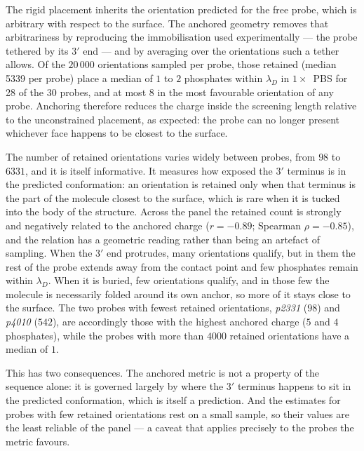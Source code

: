 The rigid placement inherits the orientation predicted for the free probe, which is arbitrary with
respect to the surface. The anchored geometry removes that arbitrariness by reproducing the
immobilisation used experimentally --- the probe tethered by its $3'$ end
\citep{campos2019,purwidyantri2021} --- and by averaging over the orientations such a tether allows.
Of the $20\,000$ orientations sampled per probe, those retained (median
5339 per probe) place a median of $1$ to $2$ phosphates
within $\lambda_D$ in $1\times$~PBS for 28 of
the $30$ probes, and at most 8 in the most
favourable orientation of any probe. Anchoring therefore reduces the charge inside the screening
length relative to the unconstrained placement, as expected: the probe can no longer present
whichever face happens to be closest to the surface.

The number of retained orientations varies widely between probes, from $98$ to $6331$, and it is
itself informative. It measures how exposed the $3'$ terminus is in the predicted conformation: an
orientation is retained only when that terminus is the part of the molecule closest to the surface,
which is rare when it is tucked into the body of the structure. Across the panel the retained count
is strongly and negatively related to the anchored charge ($r = -0.89$; Spearman $\rho = -0.85$),
and the relation has a geometric reading rather than being an artefact of sampling. When the $3'$
end protrudes, many orientations qualify, but in them the rest of the probe extends away from the
contact point and few phosphates remain within $\lambda_D$. When it is buried, few orientations
qualify, and in those few the molecule is necessarily folded around its own anchor, so more of it
stays close to the surface. The two probes with fewest retained orientations, \emph{p2331} ($98$)
and \emph{p4010} ($542$), are accordingly those with the highest anchored charge ($5$ and $4$
phosphates), while the probes with more than $4000$ retained orientations have a median of $1$.

This has two consequences. The anchored metric is not a property of the sequence alone: it is governed
largely by where the $3'$ terminus happens to sit in the predicted conformation, which is itself a
prediction. And the estimates for probes with few retained orientations rest on a small sample, so
their values are the least reliable of the panel --- a caveat that applies precisely to the probes
the metric favours.

